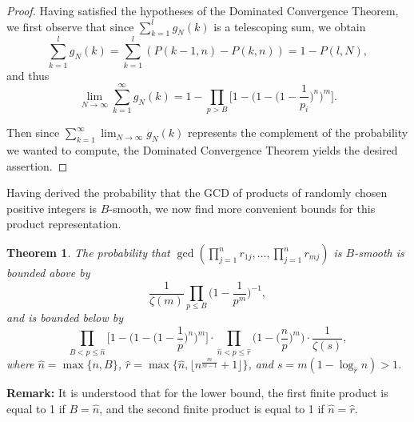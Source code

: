 \documentclass[12pt]{amsart}
\newtheorem{theorem}{Theorem}[subsection]
\theoremstyle{definition}
\begin{document}
\begin{proof}
	Having satisfied the hypotheses of the Dominated Convergence Theorem, we first observe that since $\sum_{k=1}^l g_N(k)$ is a telescoping sum, we obtain
	$$\sum_{k=1}^l g_N(k) = \sum_{k=1}^l (P(k-1, n) - P(k, n)) = 1 - P(l, N),$$ 
	and thus
	$$\lim_{N \to \infty} \sum_{k=1}^{\infty} g_N(k) = 1 - \prod_{p > B} \Big[1 - \Big(1 - \Big(1 - \frac{1}{p_i}  \Big)^n\Big)^m\Big].$$
	
	\noindent Then since $\displaystyle \sum_{k=1}^{\infty} \lim_{N \to \infty} g_N(k)$ represents the complement of the probability we wanted to compute, the Dominated Convergence Theorem yields the desired assertion.
\end{proof}

Having derived the probability that the GCD of products of randomly chosen positive integers is $B$-smooth, we now find more convenient bounds for this product representation.

\begin{theorem} The probability that $\gcd(\prod_{j=1}^n r_{1j}, ..., \prod_{j=1}^{n}r_{mj})$ is $B$-smooth is bounded above by 
	$$\frac{1}{\zeta(m)}\prod_{p\leq B}\Big(1-\frac{1}{p^m}\Big)^{-1},$$
	and is bounded below by 
	$$\prod_{B<p\leq\hat{n}} \Big[1 - \Big(1 - \Big(1 - \frac{1}{p}\Big)^n \Big)^m\Big] \cdot \prod_{\hat{n}<p\leq\hat{r}} \Big(1 - \Big(\frac{n}{p}\Big)^m\Big) \cdot \frac{1}{\zeta(s)},$$
	where $\hat{n}=\max\{n,B\}$, $\hat{r}=\max\{\hat{n}, \lfloor n^{\frac{m}{m-1}}+1\rfloor\}$, and $s = m(1 - \log_{\hat{r}}{n}) > 1$.
\end{theorem} 

\noindent \textbf{Remark:} It is understood that for the lower bound, the first finite product is equal to 1 if $B = \hat{n}$, and the second finite product is equal to 1 if $\hat{n}=\hat{r}$.
\end{document}
